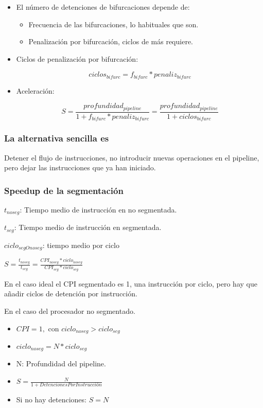 \documentclass[12pt, twoside, openright]{report} %
\begin{document}
\begin{itemize}
\begin{itemize}
      \end{itemize}
          
      \item El número de detenciones de bifurcaciones depende de:
      \begin{itemize}
        \item Frecuencia de las bifurcaciones, lo habituales que son.
        \item Penalización por bifurcación, ciclos de más requiere.
      \end{itemize}
      
      \item Ciclos de penalización por bifurcación:
          
      $$ciclos_{bifurc} = f_{bifurc}*penaliz_{bifurc}$$
      \item Aceleración:
          
        $$S= \frac {profundidad_{pipeline}} {1+ f_{bifurc}*penaliz_{bifurc}} = \frac {profundidad_{pipeline}} {1+ ciclos_{bifurc}}$$
    \end{itemize}
    
    
\subsubsection{La alternativa sencilla es}
    Detener el flujo de instrucciones, no introducir nuevas operaciones en el pipeline, pero dejar las instrucciones que ya han iniciado.
\subsubsection{Speedup de la segmentación}
    $t_{noseg}$: Tiempo medio de instrucción en no segmentada.
    
    $t_{seg}$: Tiempo medio de instrucción en segmentada.
    
    $ciclo_{segOnoseg}$: tiempo medio por ciclo
    
    $S= \frac { t_{noseg}} { t_{seg}} = \frac { CPI_{noseg} * ciclo_{noseg}} { CPI_{seg} * ciclo_{seg}}$
    
    En el caso ideal el CPI segmentado es 1, una instrucción por ciclo, pero hay que añadir ciclos de detención por instrucción.
    
    En el caso del procesador no segmentado.
    \begin{itemize}
      \item $CPI=1,$ con $ciclo_{noseg} > ciclo_{seg}$
      \item $ciclo_{noseg} = N* ciclo_{seg}$
      \item N: Profundidad del pipeline.
      \item $S= \frac {N} { 1+ DetencionesPorInstrucción}$
      \item Si no hay detenciones: $S=N$
    \end{itemize}
       
\end{document}
